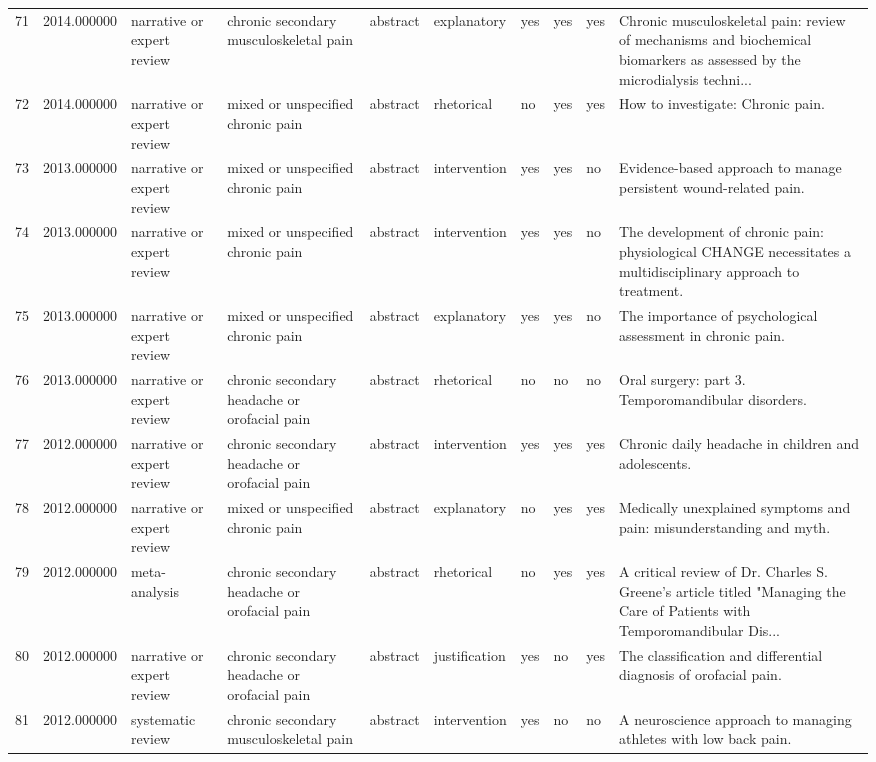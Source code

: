 \begin{longtable}{p{0.7cm}p{0.7cm}p{1.2cm}p{1.9cm}p{1.3cm}p{1.5cm}p{0.55cm}p{0.55cm}p{0.55cm}p{3.2cm}}
71 & 2014.000000 & narrative or expert review & chronic secondary musculoskeletal pain & abstract & explanatory & yes & yes & yes & Chronic musculoskeletal pain: review of mechanisms and biochemical biomarkers as assessed by the microdialysis techni... \\
72 & 2014.000000 & narrative or expert review & mixed or unspecified chronic pain & abstract & rhetorical & no & yes & yes & How to investigate: Chronic pain. \\
73 & 2013.000000 & narrative or expert review & mixed or unspecified chronic pain & abstract & intervention & yes & yes & no & Evidence-based approach to manage persistent wound-related pain. \\
74 & 2013.000000 & narrative or expert review & mixed or unspecified chronic pain & abstract & intervention & yes & yes & no & The development of chronic pain: physiological CHANGE necessitates a multidisciplinary approach to treatment. \\
75 & 2013.000000 & narrative or expert review & mixed or unspecified chronic pain & abstract & explanatory & yes & yes & no & The importance of psychological assessment in chronic pain. \\
76 & 2013.000000 & narrative or expert review & chronic secondary headache or orofacial pain & abstract & rhetorical & no & no & no & Oral surgery: part 3. Temporomandibular disorders. \\
77 & 2012.000000 & narrative or expert review & chronic secondary headache or orofacial pain & abstract & intervention & yes & yes & yes & Chronic daily headache in children and adolescents. \\
78 & 2012.000000 & narrative or expert review & mixed or unspecified chronic pain & abstract & explanatory & no & yes & yes & Medically unexplained symptoms and pain: misunderstanding and myth. \\
79 & 2012.000000 & meta-analysis & chronic secondary headache or orofacial pain & abstract & rhetorical & no & yes & yes & A critical review of Dr. Charles S. Greene's article titled "Managing the Care of Patients with Temporomandibular Dis... \\
80 & 2012.000000 & narrative or expert review & chronic secondary headache or orofacial pain & abstract & justification & yes & no & yes & The classification and differential diagnosis of orofacial pain. \\
81 & 2012.000000 & systematic review & chronic secondary musculoskeletal pain & abstract & intervention & yes & no & no & A neuroscience approach to managing athletes with low back pain. \\

\end{longtable}

